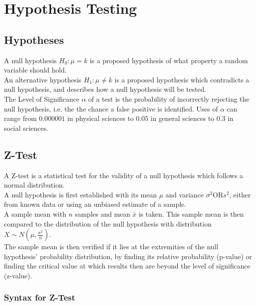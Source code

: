 \documentclass[../main]{subfiles}
\begin{document}
\section{Hypothesis Testing}

	\subsection{Hypotheses}

	A null hypothesis \(H_0 : \mu = k\) is a proposed hypothesis of what property a random variable should hold. \\

	An alternative hypothesis \(H_1 : \mu \neq k\) is a proposed hypothesis which contradicts a null hypothesis, and describes how a null hypothesis will be tested. \\

	The Level of Significance \(\alpha\) of a test is the probability of incorrectly rejecting the null hypothesis, i.e. the the chance a false positive is identified. Uses of \(\alpha\) can range from \(0.000001\) in physical sciences to \(0.05\) in general sciences to \(0.3\) in social sciences. \\

	\subsection{Z-Test}

	A Z-test is a statistical test for the validity of a null hypothesis which follows a normal distribution. \\

	A null hypothesis is first established with its mean \(\mu\) and variance \(\sigma^2 \text{OR} s^2\), either from known data or using an unbiased estimate of a sample. \\

	A sample mean with \(n\) samples and mean \(\bar{x}\) is taken. This sample mean is then compared to the distribution of the null hypothesis with distribution \(X \sim N(\mu,\frac{\sigma^2}{n} )\). \\

	The sample mean is then verified if it lies at the extremities of the null hypothesis' probability distribution, by finding its relative probability (p-value) or finding the critical value at which results then are beyond the level of significance (z-value). \\

	\subsubsection{Syntax for Z-Test}
\end{document}

